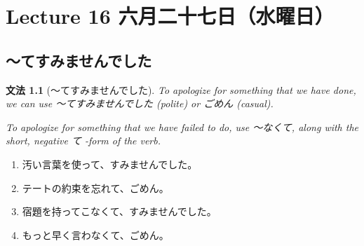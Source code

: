 \documentclass[notoc,notitlepage]{tufte-book}
\newtheorem{grammar}{\faBook \enspace 文法}[section]
\begin{document}
\chapter{Lecture 16 六月二十七日（水曜日）}%
\label{chp:lecture_16_liu_yue_er_shi_qi_ri_shui_yao_ri_}

\section{〜てすみませんでした}%
\label{sec:_tesumimasendeshita}

\begin{grammar}[〜てすみませんでした]
\label{grammar:_tesumimasendeshita}
  To apologize for something that we have done, we can use 〜てすみませんでした (polite) or ごめん (casual).

  To apologize for something that we have failed to do, use 〜なくて, along with the short, negative て -form of the verb.
\end{grammar}

\begin{eg}
  \begin{enumerate}
    \item 汚い言葉を使って、すみませんでした。
    \item テートの約束を忘れて、ごめん。
    \item 宿題を持ってこなくて、すみませんでした。
    \item もっと早く言わなくて、ごめん。
  \end{enumerate}
\end{eg}
\end{document}
